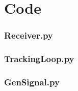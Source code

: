 \label{ch:Code}
\chapter{Code}

\subsection{Receiver.py}


\subsection{TrackingLoop.py}


\subsection{GenSignal.py}


